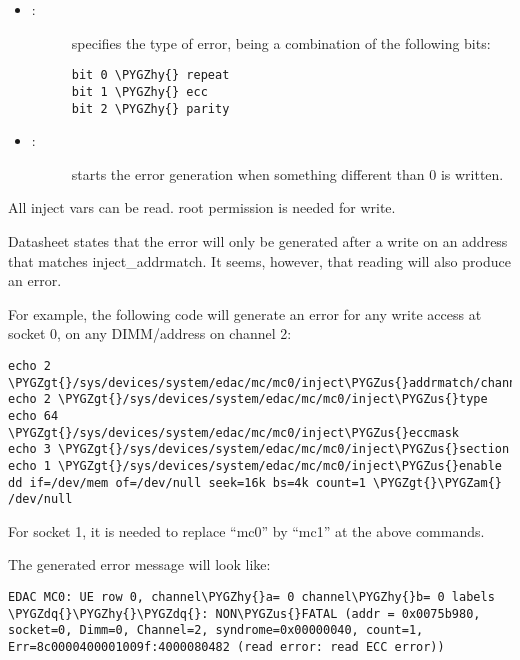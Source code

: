 \documentclass[a4paper,8pt,english]{sphinxmanual}
\def\PYGZus{\char`\_}
\def\PYGZam{\char`\&}
\def\PYGZgt{\char`\>}
\def\PYGZhy{\char`\-}
\def\PYGZdq{\char`\"}
\begin{document}
\begin{enumerate}
\begin{itemize}
\item {} \begin{description}
\item[{:}] \leavevmode
specifies the type of error, being a combination of the following bits:

\begin{Verbatim}[commandchars=\\\{\}]
bit 0 \PYGZhy{} repeat
bit 1 \PYGZhy{} ecc
bit 2 \PYGZhy{} parity
\end{Verbatim}

\end{description}

\item {} \begin{description}
\item[{:}] \leavevmode
starts the error generation when something different than 0 is written.

\end{description}

\end{itemize}

All inject vars can be read. root permission is needed for write.

Datasheet states that the error will only be generated after a write on an
address that matches inject\_addrmatch. It seems, however, that reading will
also produce an error.

For example, the following code will generate an error for any write access
at socket 0, on any DIMM/address on channel 2:

\begin{Verbatim}[commandchars=\\\{\}]
echo 2 \PYGZgt{}/sys/devices/system/edac/mc/mc0/inject\PYGZus{}addrmatch/channel
echo 2 \PYGZgt{}/sys/devices/system/edac/mc/mc0/inject\PYGZus{}type
echo 64 \PYGZgt{}/sys/devices/system/edac/mc/mc0/inject\PYGZus{}eccmask
echo 3 \PYGZgt{}/sys/devices/system/edac/mc/mc0/inject\PYGZus{}section
echo 1 \PYGZgt{}/sys/devices/system/edac/mc/mc0/inject\PYGZus{}enable
dd if=/dev/mem of=/dev/null seek=16k bs=4k count=1 \PYGZgt{}\PYGZam{} /dev/null
\end{Verbatim}

For socket 1, it is needed to replace ``mc0'' by ``mc1'' at the above
commands.

The generated error message will look like:

\begin{Verbatim}[commandchars=\\\{\}]
EDAC MC0: UE row 0, channel\PYGZhy{}a= 0 channel\PYGZhy{}b= 0 labels \PYGZdq{}\PYGZhy{}\PYGZdq{}: NON\PYGZus{}FATAL (addr = 0x0075b980, socket=0, Dimm=0, Channel=2, syndrome=0x00000040, count=1, Err=8c0000400001009f:4000080482 (read error: read ECC error))
\end{Verbatim}


\end{enumerate}
\end{document}
